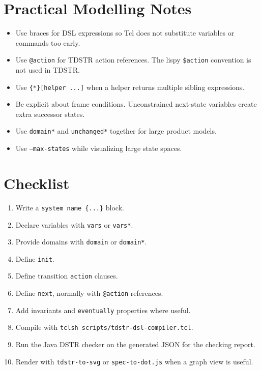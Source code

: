 \documentclass[11pt]{article}
\begin{document}
\section{Practical Modelling Notes}

\begin{itemize}
\item Use braces for DSL expressions so Tcl does not substitute variables or
  commands too early.
\item Use \texttt{@action} for TDSTR action references.  The lispy
  \texttt{\$action} convention is not used in TDSTR.
\item Use \texttt{\{*\}[helper ...]} when a helper returns multiple sibling
  expressions.
\item Be explicit about frame conditions.  Unconstrained next-state variables
  create extra successor states.
\item Use \texttt{domain*} and \texttt{unchanged*} together for large product
  models.
\item Use \texttt{--max-states} while visualizing large state spaces.
\end{itemize}

\section{Checklist}

\begin{enumerate}
\item Write a \texttt{system name \{...\}} block.
\item Declare variables with \texttt{vars} or \texttt{vars*}.
\item Provide domains with \texttt{domain} or \texttt{domain*}.
\item Define \texttt{init}.
\item Define transition \texttt{action} clauses.
\item Define \texttt{next}, normally with \texttt{@action} references.
\item Add invariants and \texttt{eventually} properties where useful.
\item Compile with \texttt{tclsh scripts/tdstr-dsl-compiler.tcl}.
\item Run the Java DSTR checker on the generated JSON for the checking report.
\item Render with \texttt{tdstr-to-svg} or \texttt{spec-to-dot.js} when a graph
  view is useful.
\end{enumerate}
\end{document}
